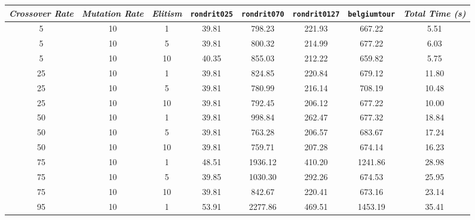\begin{table}[H]
\centering

\footnotesize
{\renewcommand{\arraystretch}{1}}
\begin{tabular}{ccc|c|c|c|c|c}
\textit{Crossover Rate} & \textit{Mutation Rate} & \textit{Elitism} & \texttt{rondrit025} & \texttt{rondrit070} & \texttt{rondrit0127} & \texttt{belgiumtour} & \textit{Total Time (s)} \\\hline
5 & 10 & 1 & \cellcolor{gray!80}39.81 & \cellcolor{gray!68}798.23 & \cellcolor{gray!38}221.93 & \cellcolor{gray!78}667.22 & 5.51\\
5 & 10 & 5 & \cellcolor{gray!80}39.81 & \cellcolor{gray!68}800.32 & \cellcolor{gray!45}214.99 & \cellcolor{gray!75}677.22 & 6.03\\
5 & 10 & 10 & \cellcolor{gray!75}40.35 & \cellcolor{gray!59}855.03 & \cellcolor{gray!47}212.22 & \cellcolor{gray!80}659.82 & 5.75\\
25 & 10 & 1 & \cellcolor{gray!80}39.81 & \cellcolor{gray!64}824.85 & \cellcolor{gray!39}220.84 & \cellcolor{gray!75}679.12 & 11.80\\
25 & 10 & 5 & \cellcolor{gray!80}39.81 & \cellcolor{gray!71}780.99 & \cellcolor{gray!44}216.14 & \cellcolor{gray!66}708.19 & 10.48\\
25 & 10 & 10 & \cellcolor{gray!80}39.81 & \cellcolor{gray!69}792.45 & \cellcolor{gray!53}206.12 & \cellcolor{gray!75}677.22 & 10.00\\
50 & 10 & 1 & \cellcolor{gray!80}39.81 & \cellcolor{gray!35}998.84 & \cellcolor{gray!1}262.47 & \cellcolor{gray!75}677.32 & 18.84\\
50 & 10 & 5 & \cellcolor{gray!80}39.81 & \cellcolor{gray!74}763.28 & \cellcolor{gray!53}206.57 & \cellcolor{gray!73}683.67 & 17.24\\
50 & 10 & 10 & \cellcolor{gray!80}39.81 & \cellcolor{gray!75}759.71 & \cellcolor{gray!52}207.28 & \cellcolor{gray!76}674.14 & 16.23\\
75 & 10 & 1 & \cellcolor{gray!1}48.51 & \cellcolor{gray!1}1936.12 & \cellcolor{gray!1}410.20 & \cellcolor{gray!1}1241.86 & 28.98\\
75 & 10 & 5 & \cellcolor{gray!80}39.85 & \cellcolor{gray!30}1030.30 & \cellcolor{gray!1}292.26 & \cellcolor{gray!76}674.53 & 25.95\\
75 & 10 & 10 & \cellcolor{gray!80}39.81 & \cellcolor{gray!61}842.67 & \cellcolor{gray!40}220.41 & \cellcolor{gray!76}673.16 & 23.14\\
95 & 10 & 1 & \cellcolor{gray!1}53.91 & \cellcolor{gray!1}2277.86 & \cellcolor{gray!1}469.51 & \cellcolor{gray!1}1453.19 & 35.41\\

\end{tabular}
\end{table}
